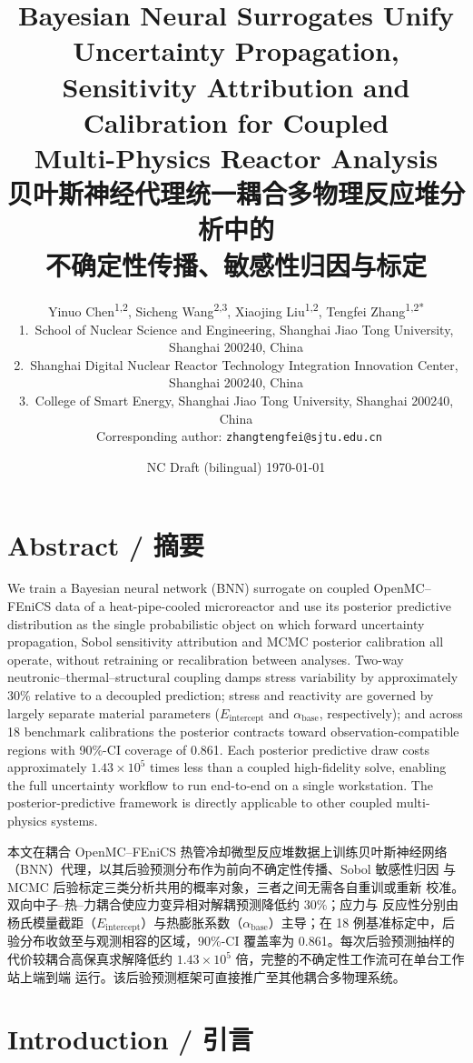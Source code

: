 \documentclass[11pt,a4paper]{article}
\title{\textbf{Bayesian Neural Surrogates Unify Uncertainty Propagation,\\
Sensitivity Attribution and Calibration for Coupled\\
Multi-Physics Reactor Analysis}\\[0.4em]
\large 贝叶斯神经代理统一耦合多物理反应堆分析中的\\
不确定性传播、敏感性归因与标定}
\author{Yinuo Chen\textsuperscript{1,2},
Sicheng Wang\textsuperscript{2,3},
Xiaojing Liu\textsuperscript{1,2},
Tengfei Zhang\textsuperscript{1,2*}\\[0.5em]
\small 1.~School of Nuclear Science and Engineering, Shanghai Jiao Tong University,
Shanghai 200240, China\\
\small 2.~Shanghai Digital Nuclear Reactor Technology Integration Innovation Center,
Shanghai 200240, China\\
\small 3.~College of Smart Energy, Shanghai Jiao Tong University,
Shanghai 200240, China\\[0.3em]
\small *~Corresponding author: \texttt{zhangtengfei@sjtu.edu.cn}}
\date{NC Draft (bilingual) \textperiodcentered{} \today}
\newcommand{\Eint}{\ensuremath{E_{\mathrm{intercept}}}}
\newcommand{\abase}{\ensuremath{\alpha_{\mathrm{base}}}}
\begin{document}
\maketitle

\section*{Abstract / 摘要}

We train a Bayesian neural network (BNN) surrogate on coupled
OpenMC--FEniCS data of a heat-pipe-cooled microreactor and use its
posterior predictive distribution as the single probabilistic object on
which forward uncertainty propagation, Sobol sensitivity attribution and
MCMC posterior calibration all operate, without retraining or
recalibration between analyses. Two-way neutronic--thermal--structural
coupling damps stress variability by approximately 30\% relative to a
decoupled prediction; stress and reactivity are governed by largely
separate material parameters (\Eint{} and \abase{}, respectively); and
across 18 benchmark calibrations the posterior contracts toward
observation-compatible regions with 90\%-CI coverage of 0.861. Each
posterior predictive draw costs approximately $1.43\times 10^{5}$ times
less than a coupled high-fidelity solve, enabling the full uncertainty
workflow to run end-to-end on a single workstation. The
posterior-predictive framework is directly applicable to other coupled
multi-physics systems.

本文在耦合 OpenMC--FEniCS 热管冷却微型反应堆数据上训练贝叶斯神经网络
（BNN）代理，以其后验预测分布作为前向不确定性传播、Sobol 敏感性归因
与 MCMC 后验标定三类分析共用的概率对象，三者之间无需各自重训或重新
校准。双向中子--热--力耦合使应力变异相对解耦预测降低约 30\%；应力与
反应性分别由杨氏模量截距（\Eint{}）与热膨胀系数（\abase{}）主导；在
18 例基准标定中，后验分布收敛至与观测相容的区域，90\%-CI 覆盖率为
0.861。每次后验预测抽样的代价较耦合高保真求解降低约
$1.43\times 10^{5}$ 倍，完整的不确定性工作流可在单台工作站上端到端
运行。该后验预测框架可直接推广至其他耦合多物理系统。

\section{Introduction / 引言}
\end{document}
